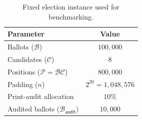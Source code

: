 \begin{table}[t]
\centering
\caption{Fixed election instance used for benchmarking.}
\label{tab:election}
\begin{tabular}{lc}
\hline
\textbf{Parameter} & \textbf{Value} \\
\hline
Ballots ($\mathcal{B}$) & $100,000$ \\
Candidates ($\mathcal{C}$) & $8$ \\
Positions ($\mathcal{P}=\mathcal{B}\mathcal{C}$) & $800,000$ \\
Padding ($n$) & $2^{20}=1,048,576$ \\
Print-audit allocation & $10\%$ \\
Audited ballots ($\mathcal{B}_{\textsf{audit}}$) & $10,000$ \\
\hline
\end{tabular}
\end{table}